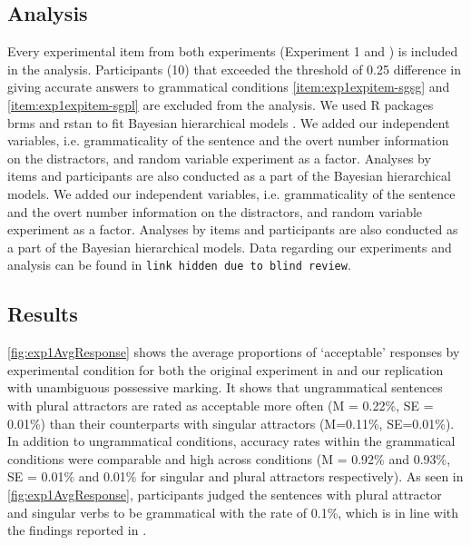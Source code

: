 \documentclass[doc,a4paper,man,natbib,floatsintext,noextraspace]{apa6}\usepackage[]{graphicx}\usepackage[]{color}
\begin{document}
\subsection{Analysis} \label{sec:exp1:analysis}

Every experimental item from both experiments (Experiment 1 and \citet{LagoEtAl:2018}) is included in the analysis. Participants (10) that exceeded the threshold of 0.25 difference in giving accurate answers to grammatical conditions \ref{item:exp1expitem-sgsg} and \ref{item:exp1expitem-sgpl} are excluded from the analysis. We used R packages brms \citep{R-brms_b} and rstan \citep{R-stan} to fit Bayesian hierarchical models \citep{GelmanHill:2007}. We added our independent variables, i.e. grammaticality of the sentence and the overt number information on the distractors, and random variable experiment as a factor. Analyses by items and participants are also conducted as a part of the Bayesian hierarchical models. We added our independent variables, i.e. grammaticality of the sentence and the overt number information on the distractors, and random variable experiment as a factor. Analyses by items and participants are also conducted as a part of the Bayesian hierarchical models.
Data regarding our experiments and analysis can be found in \texttt{link hidden due to blind review}.



\subsection{Results} \label{sec:exp1:results}



\autoref{fig:exp1AvgResponse} shows the average proportions of ‘acceptable’ responses by experimental condition for both the original experiment in \citet{LagoEtAl:2018} and our replication with unambiguous possessive marking. It shows that ungrammatical sentences with plural attractors are rated as acceptable more often (M = 0.22\%, SE = 0.01\%) than their counterparts with singular attractors (M=0.11\%, SE=0.01\%). In addition to ungrammatical conditions, accuracy rates within the grammatical conditions were comparable and high across conditions (M = 0.92\% and 0.93\%, SE = 0.01\% and 0.01\% for singular and plural attractors respectively). As seen in \autoref{fig:exp1AvgResponse}, participants judged the sentences with plural attractor and singular verbs to be grammatical with the rate of 0.1\%, which is in line with the findings reported in \citet{LagoEtAl:2018}.    
\end{document}
